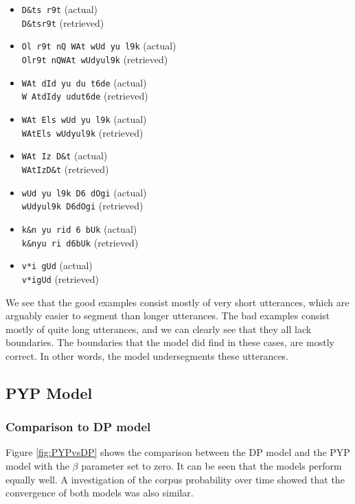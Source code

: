 \begin{multicols}{2}
\begin{itemize}
\item \texttt{D\&ts r9t} (actual)\\ \texttt{D\&tsr9t} (retrieved)
\item \texttt{Ol r9t nQ WAt wUd yu l9k} (actual)\\ \texttt{Olr9t nQWAt wUdyul9k} (retrieved)
\item \texttt{WAt dId yu du t6de} (actual)\\ \texttt{W AtdIdy udut6de} (retrieved)
\item \texttt{WAt Els wUd yu l9k} (actual)\\ \texttt{WAtEls wUdyul9k} (retrieved)
\item \texttt{WAt Iz D\&t} (actual)\\ \texttt{WAtIzD\&t} (retrieved)
\item \texttt{wUd yu l9k D6 dOgi} (actual)\\ \texttt{wUdyul9k D6dOgi} (retrieved)
\item \texttt{k\&n yu rid 6 bUk} (actual)\\ \texttt{k\&nyu ri d6bUk} (retrieved)
\item \texttt{v*i gUd} (actual)\\ \texttt{v*igUd} (retrieved)
\end{itemize}

\end{multicols}


We see that the good examples consist mostly of very short utterances, which are arguably easier to segment than longer utterances. The bad examples consist mostly of quite long utterances, and we can clearly see that they all lack boundaries. The boundaries that the model did find in these cases, are mostly correct. In other words, the model undersegments these utterances.

\subsection{PYP Model}

\subsubsection{Comparison to DP model}
Figure \ref{fig:PYPvsDP} shows the comparison between the DP model and the PYP model with the $\beta$ parameter set to zero. It can be seen that the models perform equally well. A investigation of the corpus probability over time showed that the convergence of both models was also similar.

